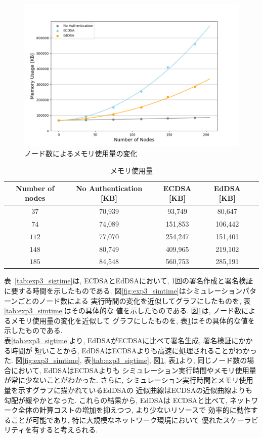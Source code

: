 \clearpage
\begin{figure}
  \centering
  \includegraphics[width=1\textwidth]{figures/exp3_memory.png}
  \caption{ノード数によるメモリ使用量の変化}
  \label{fig:memory_usages}
\end{figure}
\setlength{\tabcolsep}{4pt}
\begin{longtable}{c|cccc}
  \caption{メモリ使用量}
  \label{tab:exp3_memory} \\
  \endfirsthead
  \hline
  Number of nodes & No Authentication [KB] & ECDSA [KB] & EdDSA [KB] \\ \hline \hline
  $37$ & 70,939 & 93,749 & 80,647 \\
  $74$ & 74,089 & 151,853 & 106,442 \\
  $112$ & 77,070 & 254,247 & 151,401 \\
  $148$ & 80,749 & 409,965 & 219,102 \\
  $185$ & 84,548 & 560,753 & 285,191 \\ \hline
\end{longtable}
\vspace{2em}
\indent 表~\ref{tab:exp3_sigtime}は, ECDSAとEdDSAにおいて, 
1回の署名作成と署名検証に要する時間を示したものである.
図\ref{fig:exp3_simtime}はシミュレーションパターンごとのノード数による
実行時間の変化を近似してグラフにしたものを, 表\ref{tab:exp3_simtime}はその具体的な
値を示したものである. 図\ref{fig:memory_usages}は, ノード数によるメモリ使用量の変化を近似して
グラフにしたものを, 表\ref{tab:exp3_memory}はその具体的な値を示したものである. \\
\indent 表\ref{tab:exp3_sigtime}より, EdDSAがECDSAに比べて署名生成, 署名検証にかかる時間が
短いことから, EdDSAはECDSAよりも高速に処理されることがわかった. 
図\ref{fig:exp3_simtime}, 表\ref{tab:exp3_sigtime}, 図\ref{fig:memory_usages}, 
表\ref{tab:exp3_memory}より, 同じノード数の場合において, EdDSAはECDSAよりも
シミュレーション実行時間やメモリ使用量が常に少ないことがわかった. 
さらに, シミュレーション実行時間とメモリ使用量を示すグラフに描かれているEdDSAの
近似曲線はECDSAの近似曲線よりも勾配が緩やかとなった. これらの結果から, EdDSAは
ECDSAと比べて, ネットワーク全体の計算コストの増加を抑えつつ, より少ないリソースで
効率的に動作することが可能であり, 特に大規模なネットワーク環境において
優れたスケーラビリティを有すると考えられる. \\


